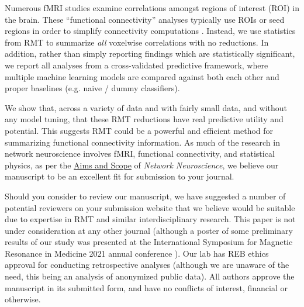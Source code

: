 \documentclass{article}
\begin{document}
Numerous fMRI studies examine correlations amongst regions of interest (ROI) in the brain. These
``functional connectivity'' analyses typically use ROIs or seed regions in order to simplify
connectivity computations \citep{huettelFunctionalMagneticResonance2004}. Instead, we use
statistics from RMT to summarize \emph{all} voxelwise correlations with no reductions. In
addition, rather than simply reporting findings which are statistically significant, we report all
analyses from a cross-validated predictive framework, where multiple machine learning models are
compared against both each other and proper baselines (e.g. naive / dummy classifiers).

We show that, across a variety of data and with fairly small data, and without any model tuning,
that these RMT reductions have real predictive utility and potential. This suggests RMT could
be a powerful and efficient method for summarizing functional connectivity information. As much of the
research in network neuroscience involves fMRI, functional connectivity, and statistical physics, as
per the \href{https://direct.mit.edu/netn/pages/submission-guidelines#aims}{Aims and Scope} of \emph{Network
Neuroscience}, we believe our manuscript to be an excellent fit for submission to your journal.

Should you consider to review our manuscript, we have suggested a number of potential reviewers on
your submission website that we believe would be suitable due to expertise in RMT and similar
interdisciplinary research. This paper is not under consideration at any other journal (although a
poster of some preliminary results of our study was presented at the International Symposium for
Magnetic Resonance in Medicine 2021 annual conference \citep{bergerOpenSourceRandom2021}). Our lab
has REB ethics approval for conducting retrospective analyses (although we are unaware of the need,
this being an analysis of anonymized public data). All authors approve the manuscript in its
submitted form, and have no conflicts of interest, financial or otherwise.
\end{document}
